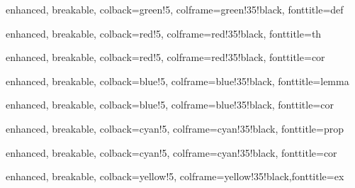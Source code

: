 







\usepackage[many]{tcolorbox}

%
{enhanced, breakable, colback=green!5, colframe=green!35!black, fonttitle=\bfseries}{def}

%
{enhanced, breakable, colback=red!5, colframe=red!35!black, fonttitle=\bfseries}{th}

%
{enhanced, breakable, colback=red!5, colframe=red!35!black, fonttitle=\bfseries}{cor}

%
{enhanced, breakable, colback=blue!5, colframe=blue!35!black, fonttitle=\bfseries}{lemma}

%
{enhanced, breakable, colback=blue!5, colframe=blue!35!black, fonttitle=\bfseries}{cor}

%
{enhanced, breakable, colback=cyan!5, colframe=cyan!35!black, fonttitle=\bfseries}{prop}

%
{enhanced, breakable, colback=cyan!5, colframe=cyan!35!black, fonttitle=\bfseries}{cor}

%
{enhanced, breakable, colback=yellow!5, colframe=yellow!35!black,fonttitle=\bfseries}{ex}

\usepackage{titlesec}

\usepackage{hyperref}

